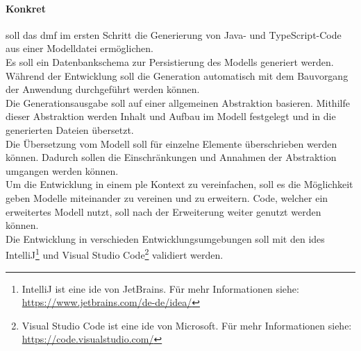 \documentclass[./einleitung.tex]{subfiles}
\begin{document}
\paragraph{Konkret} soll das \acrshort{dmf} im ersten Schritt die Generierung von Java- und TypeScript-Code aus einer Modelldatei ermöglichen.\\
Es soll ein Datenbankschema zur Persistierung des Modells generiert werden.\\
Während der Entwicklung soll die Generation automatisch mit dem Bauvorgang der Anwendung durchgeführt werden können.\\
Die Generationsausgabe soll auf einer allgemeinen Abstraktion basieren.
Mithilfe dieser Abstraktion werden Inhalt und Aufbau im Modell festgelegt und in die generierten Dateien übersetzt.\\
Die Übersetzung vom Modell soll für einzelne Elemente überschrieben werden können.
Dadurch sollen die Einschränkungen und Annahmen der Abstraktion umgangen werden können.\\
Um die Entwicklung in einem \acrshort{ple} Kontext zu vereinfachen, soll es die Möglichkeit geben Modelle miteinander zu vereinen und zu erweitern.
Code, welcher ein erweitertes Modell nutzt, soll nach der Erweiterung weiter genutzt werden können.\\
Die Entwicklung in verschieden Entwicklungsumgebungen soll mit den \acrshort{ide}s IntelliJ\footnote{IntelliJ ist eine \acrshort{ide} von JetBrains. Für mehr Informationen siehe: \url{https://www.jetbrains.com/de-de/idea/}} und Visual Studio Code\footnote{Visual Studio Code ist eine \acrshort{ide} von Microsoft. Für mehr Informationen siehe: \url{https://code.visualstudio.com/}} validiert werden.\\
\end{document}
